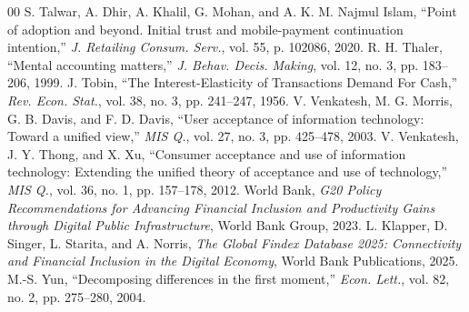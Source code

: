 \documentclass[conference]{IEEEtran}
\begin{document}
\begin{thebibliography}{00}
 S. Talwar, A. Dhir, A. Khalil, G. Mohan, and A. K. M. Najmul Islam, ``Point of adoption and beyond. Initial trust and mobile-payment continuation intention,'' \textit{J. Retailing Consum. Serv.}, vol. 55, p. 102086, 2020.
 R. H. Thaler, ``Mental accounting matters,'' \textit{J. Behav. Decis. Making}, vol. 12, no. 3, pp. 183--206, 1999.
 J. Tobin, ``The Interest-Elasticity of Transactions Demand For Cash,'' \textit{Rev. Econ. Stat.}, vol. 38, no. 3, pp. 241--247, 1956.
 V. Venkatesh, M. G. Morris, G. B. Davis, and F. D. Davis, ``User acceptance of information technology: Toward a unified view,'' \textit{MIS Q.}, vol. 27, no. 3, pp. 425--478, 2003.
 V. Venkatesh, J. Y. Thong, and X. Xu, ``Consumer acceptance and use of information technology: Extending the unified theory of acceptance and use of technology,'' \textit{MIS Q.}, vol. 36, no. 1, pp. 157--178, 2012.
 World Bank, \textit{G20 Policy Recommendations for Advancing Financial Inclusion and Productivity Gains through Digital Public Infrastructure}, World Bank Group, 2023.
 L. Klapper, D. Singer, L. Starita, and A. Norris, \textit{The Global Findex Database 2025: Connectivity and Financial Inclusion in the Digital Economy}, World Bank Publications, 2025.
 M.-S. Yun, ``Decomposing differences in the first moment,'' \textit{Econ. Lett.}, vol. 82, no. 2, pp. 275--280, 2004.
\end{thebibliography}
\end{document}
